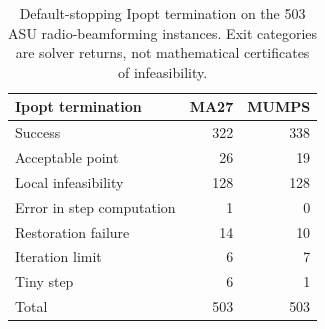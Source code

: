 \documentclass[pdflatex,sn-mathphys-num]{sn-jnl}
\theoremstyle{thmstyleone}
\theoremstyle{thmstylethree}
\newenvironment{scaledtable}[1][tbp]{\begin{tableorg}[#1]\centering}{\end{tableorg}}
\begin{document}
\begin{scaledtable}[!htbp]
\centering\small
\caption{MA27-baseline paired outcomes relative to both default-stopping
Ipopt references. The four categories partition each target regime.}
\label{tab:R3-reference-core}
\end{scaledtable}

\begin{scaledtable}[!htbp]
\centering\small
\caption{MUMPS-baseline paired outcomes relative to both default-stopping
Ipopt references.}
\label{tab:R3-reference-mumps}
\end{scaledtable}

\begin{table}[!htbp]
\centering\small
\caption{Default-stopping Ipopt termination on the 503 ASU
radio-beamforming instances. Exit categories are solver returns, not
mathematical certificates of infeasibility.}
\label{tab:asu-returns}

\begin{tabular}{lrr}
\toprule
Ipopt termination & MA27 & MUMPS \\
\midrule
Success & 322 & 338 \\
Acceptable point & 26 & 19 \\
Local infeasibility & 128 & 128 \\
Error in step computation & 1 & 0 \\
Restoration failure & 14 & 10 \\
Iteration limit & 6 & 7 \\
Tiny step & 6 & 1 \\
Total & 503 & 503 \\
\bottomrule
\end{tabular}


\end{table}
\end{document}

